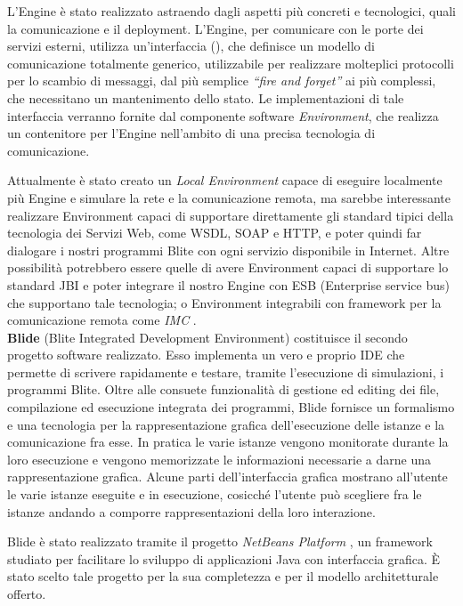 L'Engine è stato realizzato astraendo dagli aspetti più concreti e
tecnologici, quali la comunicazione e il deployment. L'Engine, per comunicare
con le porte dei servizi esterni, utilizza un'interfaccia
(), che definisce un modello di comunicazione totalmente
generico, utilizzabile per realizzare molteplici protocolli per lo scambio di
messaggi, dal più semplice \emph{``fire and forget''} ai più complessi, che necessitano un
mantenimento dello stato. Le implementazioni di tale interfaccia verranno fornite
dal componente software \emph{Environment}, che realizza un contenitore per
l'Engine nell'ambito di una precisa tecnologia di comunicazione. 

Attualmente è stato creato un \emph{Local Environment} capace di eseguire
localmente più Engine e simulare la rete e la comunicazione remota, ma sarebbe
interessante realizzare Environment capaci di supportare direttamente gli
standard tipici della tecnologia dei Servizi Web, come WSDL, SOAP e HTTP, e poter
quindi far dialogare i nostri programmi Blite con ogni servizio disponibile in
Internet. Altre possibilità potrebbero essere quelle di avere Environment capaci
di supportare lo standard JBI \cite{JBI} e poter integrare il nostro Engine con
ESB (Enterprise service bus) che supportano tale tecnologia; o Environment
integrabili con framework per la comunicazione remota come \emph{IMC} \cite{IMC}.
\\

\textbf{Blide} (Blite Integrated Development Environment) costituisce il
secondo progetto software realizzato. Esso implementa un
vero e proprio IDE che permette di scrivere rapidamente e testare, tramite
l'esecuzione di simulazioni, i programmi Blite. Oltre alle consuete
funzionalità di gestione ed editing dei file, compilazione ed esecuzione
integrata dei programmi, Blide fornisce un formalismo e una tecnologia per la
rappresentazione grafica dell'esecuzione delle istanze e la comunicazione fra
esse. In pratica le varie istanze vengono monitorate durante la loro esecuzione
e vengono memorizzate le informazioni necessarie a darne una rappresentazione
grafica. Alcune parti dell'interfaccia grafica mostrano all'utente le varie
istanze eseguite e in esecuzione, cosicché l'utente può scegliere fra le istanze
andando a comporre rappresentazioni della loro interazione.

Blide è stato realizzato tramite il progetto \emph{NetBeans Platform}
\cite{NBPlatSite}, un framework studiato per facilitare lo sviluppo di applicazioni
Java con interfaccia grafica. \`E stato scelto tale progetto per la sua
completezza e per il modello architetturale offerto. 

